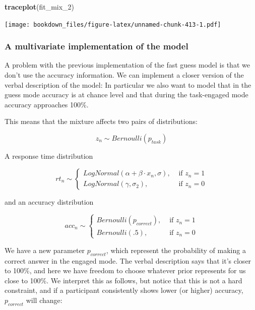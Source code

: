 \documentclass[12pt,]{krantz}
\newenvironment{Shaded}{\begin{snugshade}}{\end{snugshade}}
\newcommand{\DecValTok}[1]{\textcolor[rgb]{0.00,0.00,0.81}{#1}}
\newcommand{\KeywordTok}[1]{\textcolor[rgb]{0.13,0.29,0.53}{\textbf{#1}}}
\newcommand{\NormalTok}[1]{#1}
\theoremstyle{definition}
\theoremstyle{definition}
\theoremstyle{definition}
\theoremstyle{remark}
\begin{document}
\begin{Shaded}
\begin{Highlighting}[]
\KeywordTok{traceplot}\NormalTok{(fit_mix_}\DecValTok{2}\NormalTok{) }
\end{Highlighting}
\end{Shaded}

\texttt{[image: bookdown\_files/figure-latex/unnamed-chunk-413-1.pdf]}

\hypertarget{sec:multmix}{%
\subsubsection{A multivariate implementation of the model}\label{sec:multmix}}

A problem with the previous implementation of the fast guess model is that we don't use the accuracy information. We can implement a closer version of the verbal description of the model:
In particular we also want to model that in the guess mode accuracy is at chance level and that during the task-engaged mode accuracy approaches 100\%.

This means that the mixture affects two pairs of distributions:

\begin{equation}
z_n \sim Bernoulli(p_{task})
\end{equation}

A response time distribution

\begin{equation}
rt_n \sim 
\begin{cases}
LogNormal(\alpha + \beta \cdot x_n, \sigma), & \text{ if } z_n =1 \\
LogNormal(\gamma, \sigma_2), & \text{ if } z_n=0
\end{cases}
\label{eq:dismix2}
\end{equation}

and an accuracy distribution

\begin{equation}
acc_n \sim 
\begin{cases}
Bernoulli(p_{correct}), & \text{ if } z_n =1 \\
Bernoulli(.5), & \text{ if } z_n=0
\end{cases}
\label{eq:dismix3}
\end{equation}

We have a new parameter \(p_{correct}\), which represent the probability of making a correct answer in the engaged mode. The verbal description says that it's closer to 100\%, and here we have freedom to choose whatever prior represents for us close to 100\%. We interpret this as follows, but notice that this is not a hard constraint, and if a participant consistently shows lower (or higher) accuracy, \(p_{correct}\) will change:
\end{document}

